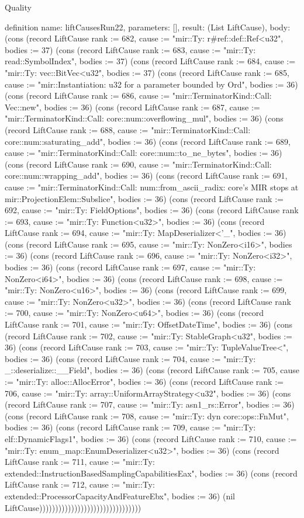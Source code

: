 \begin{lexlean}{Quality}
\begin{semanticmodule}
definition{
  name: liftCausesRun22,
  parameters: [],
  result: (List LiftCause),
  body: (cons (record LiftCause {rank := 682, cause := "mir::Ty: r#ref::def::Ref<u32", bodies := 37}) (cons (record LiftCause {rank := 683, cause := "mir::Ty: read::SymbolIndex", bodies := 37}) (cons (record LiftCause {rank := 684, cause := "mir::Ty: vec::BitVec<u32", bodies := 37}) (cons (record LiftCause {rank := 685, cause := "mir::Instantiation: u32 for a parameter bounded by Ord", bodies := 36}) (cons (record LiftCause {rank := 686, cause := "mir::TerminatorKind::Call: Vec::new", bodies := 36}) (cons (record LiftCause {rank := 687, cause := "mir::TerminatorKind::Call: core::num::overflowing_mul", bodies := 36}) (cons (record LiftCause {rank := 688, cause := "mir::TerminatorKind::Call: core::num::saturating_add", bodies := 36}) (cons (record LiftCause {rank := 689, cause := "mir::TerminatorKind::Call: core::num::to_ne_bytes", bodies := 36}) (cons (record LiftCause {rank := 690, cause := "mir::TerminatorKind::Call: core::num::wrapping_add", bodies := 36}) (cons (record LiftCause {rank := 691, cause := "mir::TerminatorKind::Call: num::from_ascii_radix: core's MIR stops at mir::ProjectionElem::Subslice", bodies := 36}) (cons (record LiftCause {rank := 692, cause := "mir::Ty: FieldOptions", bodies := 36}) (cons (record LiftCause {rank := 693, cause := "mir::Ty: Function<u32>", bodies := 36}) (cons (record LiftCause {rank := 694, cause := "mir::Ty: MapDeserializer<'_", bodies := 36}) (cons (record LiftCause {rank := 695, cause := "mir::Ty: NonZero<i16>", bodies := 36}) (cons (record LiftCause {rank := 696, cause := "mir::Ty: NonZero<i32>", bodies := 36}) (cons (record LiftCause {rank := 697, cause := "mir::Ty: NonZero<i64>", bodies := 36}) (cons (record LiftCause {rank := 698, cause := "mir::Ty: NonZero<u16>", bodies := 36}) (cons (record LiftCause {rank := 699, cause := "mir::Ty: NonZero<u32>", bodies := 36}) (cons (record LiftCause {rank := 700, cause := "mir::Ty: NonZero<u64>", bodies := 36}) (cons (record LiftCause {rank := 701, cause := "mir::Ty: OffsetDateTime", bodies := 36}) (cons (record LiftCause {rank := 702, cause := "mir::Ty: StableGraph<u32", bodies := 36}) (cons (record LiftCause {rank := 703, cause := "mir::Ty: TupleValueTree<", bodies := 36}) (cons (record LiftCause {rank := 704, cause := "mir::Ty: _::deserialize::__Field", bodies := 36}) (cons (record LiftCause {rank := 705, cause := "mir::Ty: alloc::AllocError", bodies := 36}) (cons (record LiftCause {rank := 706, cause := "mir::Ty: array::UniformArrayStrategy<u32", bodies := 36}) (cons (record LiftCause {rank := 707, cause := "mir::Ty: asn1_rs::Error", bodies := 36}) (cons (record LiftCause {rank := 708, cause := "mir::Ty: dyn core::ops::FnMut", bodies := 36}) (cons (record LiftCause {rank := 709, cause := "mir::Ty: elf::DynamicFlags1", bodies := 36}) (cons (record LiftCause {rank := 710, cause := "mir::Ty: enum_map::EnumDeserializer<u32>", bodies := 36}) (cons (record LiftCause {rank := 711, cause := "mir::Ty: extended::InstructionBasedSamplingCapabilitiesEax", bodies := 36}) (cons (record LiftCause {rank := 712, cause := "mir::Ty: extended::ProcessorCapacityAndFeatureEbx", bodies := 36}) (nil LiftCause))))))))))))))))))))))))))))))))
}


\end{semanticmodule}
\end{lexlean}
